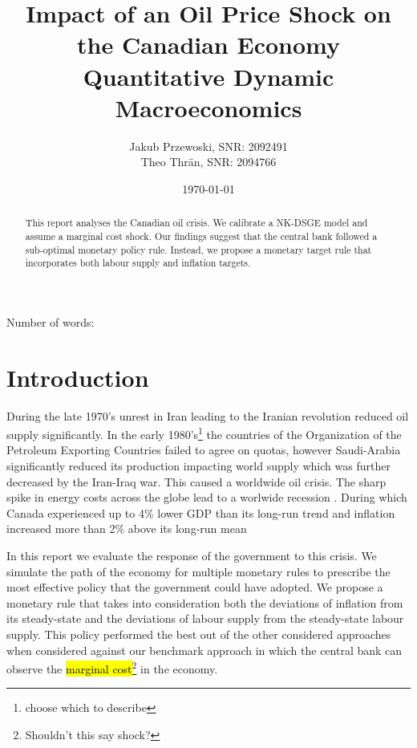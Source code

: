 \documentclass[12pt]{article}
\title{\textbf{Impact of an Oil Price Shock on the Canadian Economy} \\ \large{Quantitative Dynamic Macroeconomics}}
\author{Jakub Przewoski, SNR: 2092491\\ Theo Thrän, SNR: 2094766}
\date{\today}
\begin{document}
\maketitle
{}

\begin{center}
    \large
    Number of words:
    
    \vfill{}
    \begin{abstract}
        This report analyses the Canadian oil crisis. We calibrate a NK-DSGE model and assume a marginal cost shock. Our findings suggest that the central bank followed a sub-optimal monetary policy rule. Instead, we propose a monetary target rule that incorporates both labour supply and inflation targets. 
    \end{abstract}
\end{center}

\newpage

\tableofcontents{}

\newpage

\section{Introduction}
During the late 1970's unrest in Iran leading to the Iranian revolution reduced oil supply significantly\parencite{OilSqueeze1979}. In the early 1980's\footnote{choose which to describe} the countries of the Organization of the Petroleum Exporting Countries failed to agree on quotas, however Saudi-Arabia significantly reduced its production impacting world supply \parencite{tagliabueOPECFAILSSET1982} which was further decreased by the Iran-Iraq war. This caused a worldwide oil crisis. The sharp spike in energy costs across the globe lead to a worlwide recession \parencite{koseGlobalRecessions2020}. During which Canada experienced up to 4\% lower GDP than its long-run trend and inflation increased more than 2\% above its long-run mean 
\parencite{worldbank_inflation_ca,fred_gdp_per_capita_ca}

In this report we evaluate the response of the government to this crisis. We simulate the path of the economy for multiple monetary rules to prescribe the most effective policy that the government could have adopted. We propose a monetary rule that takes into consideration both the deviations of inflation from its steady-state and the deviations of labour supply from the steady-state labour supply. This policy performed the best out of the other considered approaches when considered against our benchmark approach in which the central bank can observe the \hl{marginal cost}\footnote{Shouldn't this say shock?} in the economy.
\end{document}
